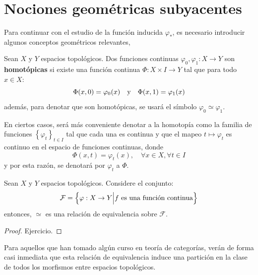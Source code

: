\documentclass[12pt]{report}
\theoremstyle{largebreak}
\newcommand\cf[3]{\ensuremath{#1:#2\rightarrow#3}}
\begin{document}
    \section{Nociones geométricas subyacentes}

    Para continuar con el estudio de la función inducida $\varphi_*$, es necesario introducir algunos conceptos geométricos relevantes,

    \begin{mydef}
        Sean $X$ y $Y$ espacios topológicos. Dos funciones continuas $\cf{\varphi_0,\varphi_1}{X}{Y}$ son \textbf{homotópicas} si existe una función continua $\cf{\Phi}{X\times I}{Y}$ tal que para todo $x\in X$:
        \begin{equation*}
            \Phi(x,0)=\varphi_0(x)\quad\textup{y}\quad\Phi(x,1)=\varphi_1(x)
        \end{equation*}
        además, para denotar que son homotópicas, se usará el símbolo $\varphi_0\simeq\varphi_1$.
    \end{mydef}

    \begin{obs}
        En ciertos casos, será más conveniente denotar a la homotopía como la familia de funciones $\left\{\varphi_t \right\}_{ t\in I}$ tal que cada una es continua y que el mapeo $t\mapsto \varphi_t$ es continuo en el espacio de funciones continuas, donde
        \begin{equation*}
            \Phi(x,t)=\varphi_t(x),\quad\forall x\in X,\forall t\in I
        \end{equation*}
        y por esta razón, se denotará por $\varphi_t$ a $\Phi$.
    \end{obs}

    \begin{propo}
        Sean $X$ y $Y$ espacios topológicos. Considere el conjunto:
        \begin{equation*}
            \mathcal{F}=\left\{\cf{\varphi}{X}{Y}\Big|f\textup{ es una función continua} \right\}
        \end{equation*}
        entonces, $\simeq$ es una relación de equivalencia sobre $\mathcal{F}$.
    \end{propo}

    \begin{proof}
        Ejercicio.
    \end{proof}

    \begin{obs}
        Para aquellos que han tomado algún curso en teoría de categorías, verán de forma casi inmediata que esta relación de equivalencia induce una partición en la clase de todos los morfismos entre espacios topológicos.
    \end{obs}
\end{document}
